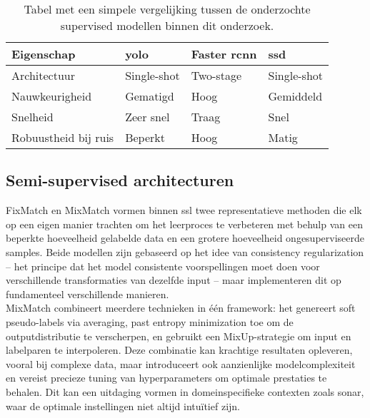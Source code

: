 \begin{table}[H]
    \centering
    \begin{tabular}{llll}
        \toprule
        \textbf{Eigenschap} & \textbf{\acrshort{yolo}} & \textbf{Faster \acrshort{rcnn}} & \textbf{\acrshort{ssd}} \\
        \midrule
        Architectuur            & Single-shot   & Two-stage     & Single-shot \\
        Nauwkeurigheid          & Gematigd      & Hoog          & Gemiddeld \\
        Snelheid                & Zeer snel     & Traag         & Snel \\
        Robuustheid bij ruis    & Beperkt       & Hoog          & Matig \\
        \bottomrule
    \end{tabular}
    \caption[Vergelijking supervised modellen]{\label{tab:comparison_supervised_models} Tabel met een simpele vergelijking tussen de onderzochte supervised modellen binnen dit onderzoek.}
\end{table}

\subsection{Semi-supervised architecturen}

FixMatch en MixMatch vormen binnen \gls{ssl} twee representatieve methoden die elk op een eigen manier trachten om het leerproces te verbeteren met behulp van een beperkte hoeveelheid gelabelde data en een grotere hoeveelheid ongesuperviseerde samples. Beide modellen zijn gebaseerd op het idee van consistency regularization -- het principe dat het model consistente voorspellingen moet doen voor verschillende transformaties van dezelfde input -- maar implementeren dit op fundamenteel verschillende manieren. \\

MixMatch combineert meerdere technieken in één framework: het genereert soft pseudo-labels via averaging, past entropy minimization toe om de outputdistributie te verscherpen, en gebruikt een MixUp-strategie om input en labelparen te interpoleren. Deze combinatie kan krachtige resultaten opleveren, vooral bij complexe data, maar introduceert ook aanzienlijke modelcomplexiteit en vereist precieze tuning van hyperparameters om optimale prestaties te behalen. Dit kan een uitdaging vormen in domeinspecifieke contexten zoals sonar, waar de optimale instellingen niet altijd intuïtief zijn. \\

